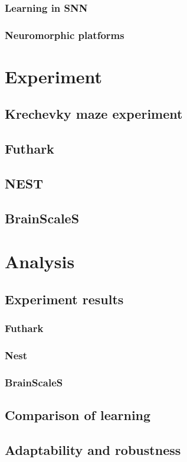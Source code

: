 \documentclass[a4paper,oneside]{memoir}
\begin{document}
  \subsection{Learning in SNN}
  \subsection{Neuromorphic platforms}

\chapter{Experiment}
  \section{Krechevky maze experiment}
  \section{Futhark}
  \section{NEST}
  \section{BrainScaleS}

\chapter{Analysis}
  \section{Experiment results}
  \subsection{Futhark}
  \subsection{Nest}
  \subsection{BrainScaleS}
  \section{Comparison of learning}
  \section{Adaptability and robustness} %
\end{document}
